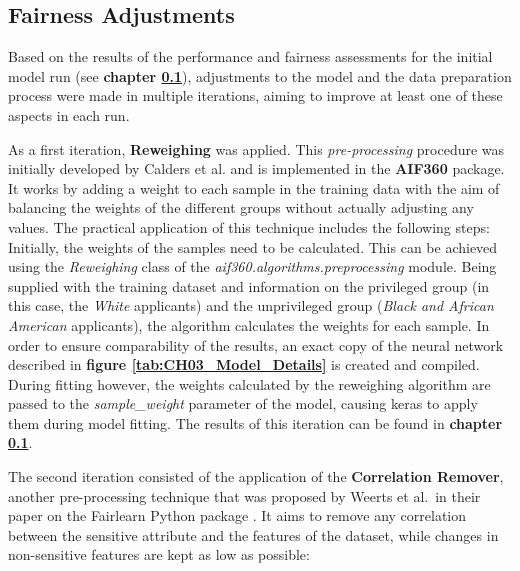 

\subsection{Fairness Adjustments}\label{subsec:Iterations}

Based on the results of the performance and fairness assessments for the initial model run (see \textbf{chapter \ref{subsec:Iterations}}), adjustments to the model and the data preparation process were made in multiple iterations, aiming to improve at least one of these aspects in each run.

As a first iteration, \textbf{Reweighing} was applied. This \textit{pre-processing} procedure was initially developed by Calders et al. \parencite{Calders2009} and is implemented in the \textbf{AIF360} package. It works by adding a weight to each sample in the training data with the aim of balancing the weights of the different groups without actually adjusting any values.
The practical application of this technique includes the following steps: Initially, the weights of the samples need to be calculated. This can be achieved using the \textit{Reweighing} class of the \textit{aif360.algorithms.preprocessing} module. Being supplied with the training dataset and information on the privileged group (in this case, the \textit{White} applicants) and the unprivileged group (\textit{Black and African American} applicants), the algorithm calculates the weights for each sample. 
In order to ensure comparability of the results, an exact copy of the neural network described in \textbf{figure \ref{tab:CH03_Model_Details}} is created and compiled. During fitting however, the weights calculated by the reweighing algorithm are passed to the \textit{sample\_weight} parameter of the model, causing keras to apply them during model fitting. The results of this iteration can be found in \textbf{chapter \ref{subsec:Iterations}}.

The second iteration consisted of the application of the \textbf{Correlation Remover}, another pre-processing technique that was proposed by Weerts et al.\ in their paper on the Fairlearn Python package \parencite{Weerts2023}. It aims to remove any correlation between the sensitive attribute and the features of the dataset, while changes in non-sensitive features are kept as low as possible:

